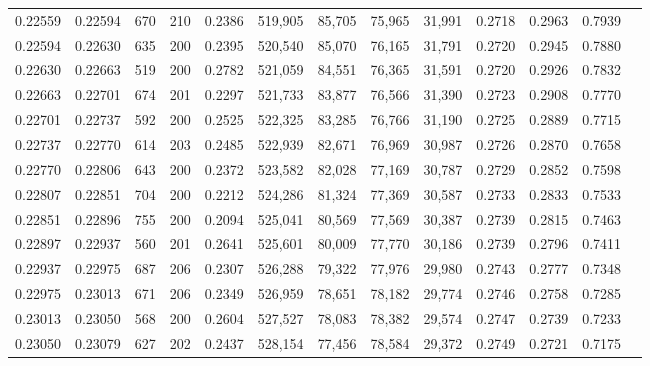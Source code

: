 \begin{tabular}{rrrrrrrrrrrrr}
0.22559 & 0.22594 &   670 & 210 &                                     0.2386 & 519,905 &  85,705 &  75,965 &  31,991 & 0.2718 & 0.2963 & 0.7939 \\
0.22594 & 0.22630 &   635 & 200 &                                     0.2395 & 520,540 &  85,070 &  76,165 &  31,791 & 0.2720 & 0.2945 & 0.7880 \\
0.22630 & 0.22663 &   519 & 200 &                                     0.2782 & 521,059 &  84,551 &  76,365 &  31,591 & 0.2720 & 0.2926 & 0.7832 \\
0.22663 & 0.22701 &   674 & 201 &                                     0.2297 & 521,733 &  83,877 &  76,566 &  31,390 & 0.2723 & 0.2908 & 0.7770 \\
0.22701 & 0.22737 &   592 & 200 &                                     0.2525 & 522,325 &  83,285 &  76,766 &  31,190 & 0.2725 & 0.2889 & 0.7715 \\
0.22737 & 0.22770 &   614 & 203 &                                     0.2485 & 522,939 &  82,671 &  76,969 &  30,987 & 0.2726 & 0.2870 & 0.7658 \\
0.22770 & 0.22806 &   643 & 200 &                                     0.2372 & 523,582 &  82,028 &  77,169 &  30,787 & 0.2729 & 0.2852 & 0.7598 \\
0.22807 & 0.22851 &   704 & 200 &                                     0.2212 & 524,286 &  81,324 &  77,369 &  30,587 & 0.2733 & 0.2833 & 0.7533 \\
0.22851 & 0.22896 &   755 & 200 &                                     0.2094 & 525,041 &  80,569 &  77,569 &  30,387 & 0.2739 & 0.2815 & 0.7463 \\
0.22897 & 0.22937 &   560 & 201 &                                     0.2641 & 525,601 &  80,009 &  77,770 &  30,186 & 0.2739 & 0.2796 & 0.7411 \\
0.22937 & 0.22975 &   687 & 206 &                                     0.2307 & 526,288 &  79,322 &  77,976 &  29,980 & 0.2743 & 0.2777 & 0.7348 \\
0.22975 & 0.23013 &   671 & 206 &                                     0.2349 & 526,959 &  78,651 &  78,182 &  29,774 & 0.2746 & 0.2758 & 0.7285 \\
0.23013 & 0.23050 &   568 & 200 &                                     0.2604 & 527,527 &  78,083 &  78,382 &  29,574 & 0.2747 & 0.2739 & 0.7233 \\
0.23050 & 0.23079 &   627 & 202 &                                     0.2437 & 528,154 &  77,456 &  78,584 &  29,372 & 0.2749 & 0.2721 & 0.7175 \\

\end{tabular}
